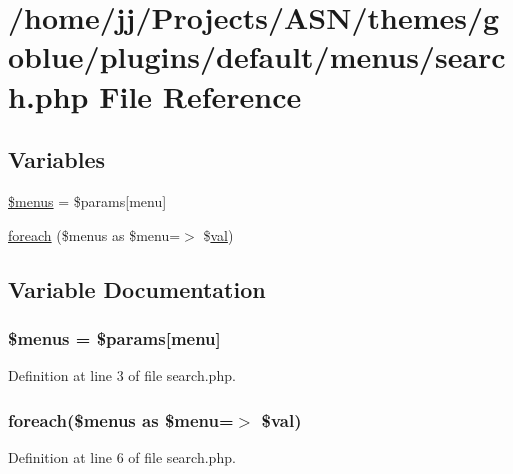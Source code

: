 \hypertarget{themes_2goblue_2plugins_2default_2menus_2search_8php}{}\section{/home/jj/\+Projects/\+A\+S\+N/themes/goblue/plugins/default/menus/search.php File Reference}
\label{themes_2goblue_2plugins_2default_2menus_2search_8php}
\subsection*{Variables}
\begin{DoxyCompactItemize}
\item 
\hyperlink{themes_2goblue_2plugins_2default_2menus_2search_8php_a681cf86fb2440a8c89c88603a08670ba}{\$menus} = \$params\mbox{[}\textquotesingle{}menu\textquotesingle{}\mbox{]}
\item 
\hyperlink{themes_2goblue_2plugins_2default_2menus_2search_8php_a93418c95dafbcc8e66e295be29c26f50}{foreach} (\$menus as \$menu=$>$ \$\hyperlink{jquery_8tokeninput_8js_a21200c34618b8c12c446cd51529ebd8c}{val})
\end{DoxyCompactItemize}


\subsection{Variable Documentation}
\subsubsection[{\texorpdfstring{\$menus}{$menus}}]{\setlength{\rightskip}{0pt plus 5cm}\$menus = \$params\mbox{[}\textquotesingle{}menu\textquotesingle{}\mbox{]}}\hypertarget{themes_2goblue_2plugins_2default_2menus_2search_8php_a681cf86fb2440a8c89c88603a08670ba}{}\label{themes_2goblue_2plugins_2default_2menus_2search_8php_a681cf86fb2440a8c89c88603a08670ba}


Definition at line 3 of file search.\+php.

\subsubsection[{\texorpdfstring{foreach}{foreach}}]{\setlength{\rightskip}{0pt plus 5cm}foreach(\$menus as \$menu=$>$ \${\bf val})}\hypertarget{themes_2goblue_2plugins_2default_2menus_2search_8php_a93418c95dafbcc8e66e295be29c26f50}{}\label{themes_2goblue_2plugins_2default_2menus_2search_8php_a93418c95dafbcc8e66e295be29c26f50}


Definition at line 6 of file search.\+php.

